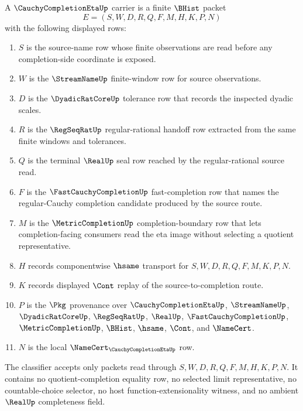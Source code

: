 \begin{definition}
\label{def:cauchy-completion-eta-carrier}
A $\CauchyCompletionEtaUp$ carrier is a finite $\BHist$ packet
$$
E=(S,W,D,R,Q,F,M,H,K,P,N)
$$
with the following displayed rows:
\begin{enumerate}
\item $S$ is the source-name row whose finite observations are read before any completion-side coordinate is exposed.
\item $W$ is the $\StreamNameUp$ finite-window row for source observations.
\item $D$ is the $\DyadicRatCoreUp$ tolerance row that records the inspected dyadic scales.
\item $R$ is the $\RegSeqRatUp$ regular-rational handoff row extracted from the same finite windows and tolerances.
\item $Q$ is the terminal $\RealUp$ seal row reached by the regular-rational source read.
\item $F$ is the $\FastCauchyCompletionUp$ fast-completion row that names the regular-Cauchy completion candidate produced by the source route.
\item $M$ is the $\MetricCompletionUp$ completion-boundary row that lets completion-facing consumers read the eta image without selecting a quotient representative.
\item $H$ records componentwise $\hsame$ transport for $S,W,D,R,Q,F,M,K,P,N$.
\item $K$ records displayed $\Cont$ replay of the source-to-completion route.
\item $P$ is the $\Pkg$ provenance over $\CauchyCompletionEtaUp$, $\StreamNameUp$, $\DyadicRatCoreUp$, $\RegSeqRatUp$, $\RealUp$, $\FastCauchyCompletionUp$, $\MetricCompletionUp$, $\BHist$, $\hsame$, $\Cont$, and $\NameCert$.
\item $N$ is the local $\NameCert_{\CauchyCompletionEtaUp}$ row.
\end{enumerate}
The classifier accepts only packets read through $S,W,D,R,Q,F,M,H,K,P,N$. It contains no quotient-completion equality row, no selected limit representative, no countable-choice selector, no host function-extensionality witness, and no ambient $\RealUp$ completeness field.
\end{definition}

